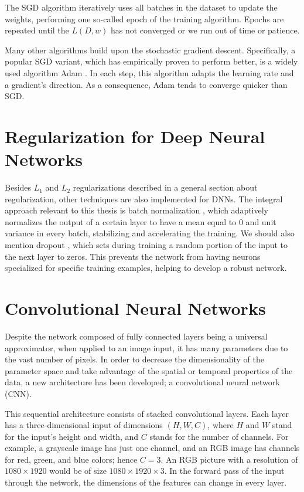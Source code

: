 The SGD algorithm iteratively uses all batches in the dataset to update the weights, performing one so-called epoch of the training algorithm. Epochs are repeated until the $L(D, w)$ has not converged or we run out of time or patience.

Many other algorithms build upon the stochastic gradient descent. Specifically, a popular SGD variant, which has empirically proven to perform better, is a widely used algorithm Adam \citep{kingma2014adam}. In each step, this algorithm adapts the learning rate and a gradient’s direction. As a consequence, Adam tends to converge quicker than SGD.

\section{Regularization for Deep Neural Networks}

Besides $L_1$ and $L_2$ regularizations described in a general section about regularization, other techniques are also implemented for DNNs. The integral approach relevant to this thesis is batch normalization \citep{ioffe2015batch}, which adaptively normalizes the output of a certain layer to have a mean equal to 0 and unit variance in every batch, stabilizing and accelerating the training. We should also mention dropout \citep{srivastava2014dropout}, which sets during training a random portion of the input to the next layer to zeros. This prevents the network from having neurons specialized for specific training examples, helping to develop a robust network.

\section{Convolutional Neural Networks}

Despite the network composed of fully connected layers being a universal approximator, when applied to an image input, it has many parameters due to the vast number of pixels. In order to decrease the dimensionality of the parameter space and take advantage of the spatial or temporal properties of the data, a new architecture has been developed; a convolutional neural network (CNN).

This sequential architecture consists of stacked convolutional layers. Each layer has a three-dimensional input of dimensions $(H, W, C)$, where $H$ and $W$ stand for the input’s height and width, and $C$ stands for the number of channels. For example, a grayscale image has just one channel, and an RGB image has channels for red, green, and blue colors; hence $C = 3$. An RGB picture with a resolution of $1080 \times 1920$ would be of size $1080 \times 1920 \times 3$. In the forward pass of the input through the network, the dimensions of the features can change in every layer. 

